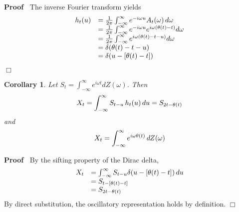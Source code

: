 \documentclass{article}
\newenvironment{proof}{\noindent\textbf{Proof\ }}{\hspace*{\fill}$\Box$\medskip}
\newtheorem{corollary}{Corollary}
\begin{document}
\begin{proof}
  The inverse Fourier transform yields
  \begin{equation}
    \begin{array}{ll}
      h_t (u) & = \frac{1}{2 \pi}  \int_{- \infty}^{\infty} e^{- i \omega u}
      A_t (\omega)  \hspace{0.17em} d \omega\\
      & = \frac{1}{2 \pi}  \int_{- \infty}^{\infty} e^{- i \omega u} e^{i
      \omega (\theta (t) - t)} d \omega\\
      & = \frac{1}{2 \pi}  \int_{- \infty}^{\infty} e^{i \omega (\theta (t) -
      t - u)} d \omega\\
      & = \delta (\theta (t) - t - u)\\
      & = \delta (u - [\theta (t) - t])
    \end{array}
  \end{equation}
  
\end{proof}

\begin{corollary}
  Let $S_t = \int_{- \infty}^{\infty} e^{i \omega t} dZ (\omega)$. Then
  \begin{equation}
    X_t = \int_{- \infty}^{\infty} S_{t - u}  \hspace{0.17em} h_t (u) 
    \hspace{0.17em} du = S_{2 t - \theta (t)}
  \end{equation}
  and
  \begin{equation}
    X_t = \int_{- \infty}^{\infty} e^{i \omega \theta (t)}  \hspace{0.17em} dZ
    (\omega)
  \end{equation}
\end{corollary}

\begin{proof}
  By the sifting property of the Dirac delta,
  \begin{equation}
    \begin{array}{ll}
      X_t & = \int_{- \infty}^{\infty} S_{t - u} \delta (u - [\theta (t) - t])
      \hspace{0.17em} du\\
      & = S_{t - [\theta (t) - t]}\\
      & = S_{2 t - \theta (t)}
    \end{array}
  \end{equation}
  By direct substitution, the oscillatory representation holds by definition.
\end{proof}
\end{document}
